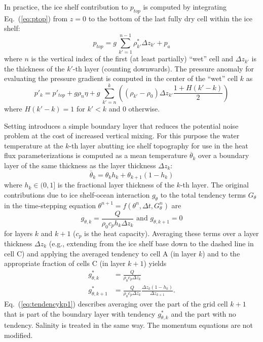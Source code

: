In practice, the ice shelf contribution to $p_{top}$ is computed by
integrating Eq.~(\ref{eq:ptop}) from $z=0$ to the bottom of the last
fully dry cell within the ice shelf:
\begin{equation}
  \label{eq:surfacepressure}
  p_{top} = g\,\sum_{k'=1}^{n-1}\rho_{k'}^{*}\Delta{z_{k'}} + p_{a}
\end{equation}
where $n$ is the vertical index of the first (at least partially)
``wet'' cell and $\Delta{z_{k'}}$ is the thickness of the $k'$-th
layer (counting downwards). The pressure anomaly for evaluating the pressure
gradient is computed in the center of the ``wet'' cell $k$ as
\begin{equation}
  \label{eq:discretizedpressure}
  p'_{k} = p'_{top} + g\rho_{n}\eta +
  g\,\sum_{k'=n}^{k}\left((\rho_{k'}-\rho_{0})\Delta{z_{k'}} 
  \frac{1+H(k'-k)}{2}\right)
\end{equation}
where $H(k'-k)=1$ for $k'<k$ and $0$ otherwise.  

Setting  introduces a simple
boundary layer that reduces the potential noise problem at the cost of
increased vertical mixing. For this purpose the water temperature at
the $k$-th layer abutting ice shelf topography for use in the heat
flux parameterizations is computed as a mean temperature
$\overline{\theta}_{k}$ over a boundary layer of the same thickness as
the layer thickness $\Delta{z}_{k}$:
\begin{equation}
  \label{eq:thetabl}
  \overline{\theta}_{k} = \theta_{k} h_{k} + \theta_{k+1} (1-h_{k})
\end{equation}
where $h_{k}\in(0,1]$ is the fractional layer thickness of the $k$-th
layer. The original contributions due to ice shelf-ocean interaction
$g_{\theta}$ to the total tendency terms $G_{\theta}$ in the
time-stepping equation
$\theta^{n+1} = f(\theta^{n},\Delta{t},G_{\theta}^{n})$ 
%
are
\begin{equation}
  \label{eq:orgtendency}
  g_{\theta,k}   = \frac{Q}{\rho_{0} c_{p} h_{k} \Delta{z}_{k}}
  \text{ and } g_{\theta,k+1} = 0
\end{equation}
for layers $k$ and $k+1$ ($c_{p}$ is the heat capacity).  Averaging
these terms over a layer thickness $\Delta{z_{k}}$ (e.g., extending
from the ice shelf base down to the dashed line in cell C) and
applying the averaged tendency to cell A (in layer $k$) and to the
appropriate fraction of cells C (in layer $k+1$) yields
\begin{align}
  \label{eq:tendencyk}
  g_{\theta,k}^*   &= \frac{Q}{\rho_{0} c_{p} \Delta{z}_{k}} \\
  \label{eq:tendencykp1}
  g_{\theta,k+1}^*
  &= \frac{Q}{\rho_{0} c_{p} \Delta{z}_{k}} 
  \frac{ \Delta{z}_{k} ( 1- h_{k} )}{\Delta{z}_{k+1}}.
\end{align}
Eq.~(\ref{eq:tendencykp1}) describes averaging over the part of the
grid cell $k+1$ that is part of the boundary layer with tendency
$g_{\theta,k}^*$ and the part with no tendency. Salinity is treated in
the same way. The momentum equations are not modified. 

